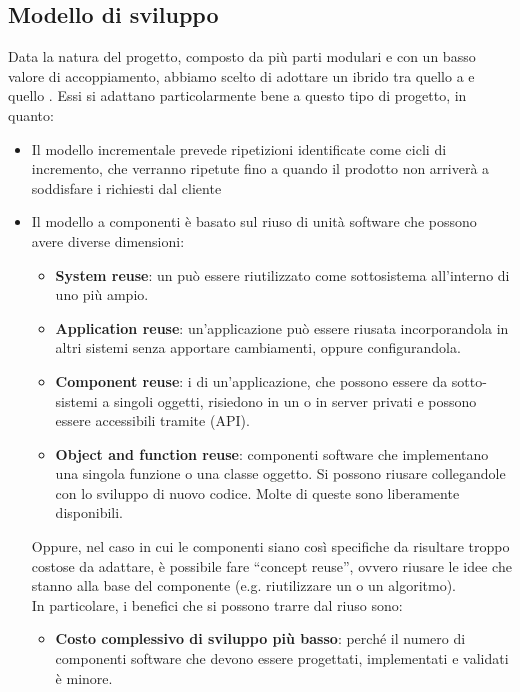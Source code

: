 	\subsection{Modello di sviluppo}\label{modello di sviluppo}
	Data la natura del progetto, composto da più parti modulari e con un basso valore di accoppiamento, abbiamo scelto di adottare un  ibrido tra quello a  e quello .
	Essi si adattano particolarmente bene a questo tipo di progetto, in quanto:
	\begin{itemize}
		\item Il modello incrementale prevede ripetizioni identificate come cicli di incremento,
		che verranno ripetute fino a quando il prodotto non arriverà a soddisfare i  richiesti dal cliente
		\item Il modello a componenti è basato sul riuso di unità software che possono avere diverse dimensioni:
		\begin{itemize}
			\item \textbf{System reuse}: un  può essere riutilizzato come sottosistema all'interno di uno più ampio.
			\item \textbf{Application reuse}: un'applicazione può essere riusata incorporandola in altri sistemi senza apportare cambiamenti, 
				oppure configurandola.
			\item \textbf{Component reuse}: i  di un'applicazione, che possono essere da sotto-sistemi a singoli oggetti, risiedono
				in un  o in server privati e possono essere accessibili tramite  (API).
			\item \textbf{Object and function reuse}: componenti software che implementano una singola funzione o una classe oggetto. Si 
				possono riusare collegandole con lo sviluppo di nuovo codice. Molte di queste sono liberamente disponibili. 
		\end{itemize}
		Oppure, nel caso in cui le componenti siano così specifiche da risultare troppo costose da adattare,
		è possibile fare ``concept reuse'', ovvero riusare le idee che stanno alla base del componente (e.g. riutilizzare un  o un algoritmo). \\
		In particolare, i benefici che si possono trarre dal riuso sono:
		\begin{itemize}
			\item \textbf{Costo complessivo di sviluppo più basso}: perché il numero di componenti software che devono essere progettati, implementati e validati è minore.

\end{itemize}
\end{itemize}
